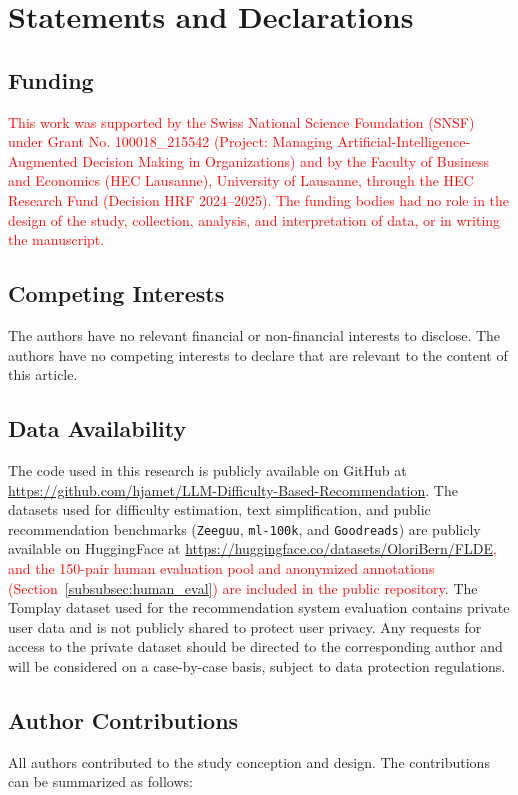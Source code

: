 \section*{Statements and Declarations}

\subsection*{Funding}
\textcolor{red}{This work was supported by the Swiss National Science Foundation (SNSF) under Grant No. 100018\_215542 (Project: Managing Artificial-Intelligence-Augmented Decision Making in Organizations) and by the Faculty of Business and Economics (HEC Lausanne), University of Lausanne, through the HEC Research Fund (Decision HRF 2024--2025). The funding bodies had no role in the design of the study, collection, analysis, and interpretation of data, or in writing the manuscript.}

\subsection*{Competing Interests}
The authors have no relevant financial or non-financial interests to disclose. The authors have no competing interests to declare that are relevant to the content of this article.

\subsection*{Data Availability}
The code used in this research is publicly available on GitHub at \url{https://github.com/hjamet/LLM-Difficulty-Based-Recommendation}. The datasets used for difficulty estimation, text simplification, and public recommendation benchmarks (\texttt{Zeeguu}, \texttt{ml-100k}, and \texttt{Goodreads}) are publicly available on HuggingFace at \textcolor{red}{\url{https://huggingface.co/datasets/OloriBern/FLDE}, and the 150-pair human evaluation pool and anonymized annotations (Section~\ref{subsubsec:human_eval}) are included in the public repository}. The Tomplay dataset used for the recommendation system evaluation contains private user data and is not publicly shared to protect user privacy. Any requests for access to the private dataset should be directed to the corresponding author and will be considered on a case-by-case basis, subject to data protection regulations.

\subsection*{Author Contributions}
All authors contributed to the study conception and design. The contributions can be summarized as follows:

